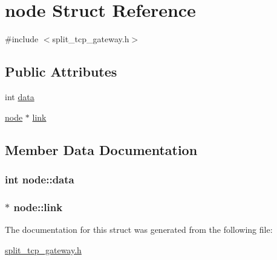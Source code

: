 \hypertarget{structnode}{\section{node \-Struct \-Reference}
\label{structnode}
}


{\ttfamily \#include $<$split\-\_\-tcp\-\_\-gateway.\-h$>$}

\subsection*{\-Public \-Attributes}
\begin{DoxyCompactItemize}
\item 
int \hyperlink{structnode_a2d890bb9f6af0ffd73fe79b21124c2a2}{data}
\item 
\hyperlink{structnode}{node} $\ast$ \hyperlink{structnode_af23d89eee1b0584d8eaf9a2e8d8f25ee}{link}
\end{DoxyCompactItemize}


\subsection{\-Member \-Data \-Documentation}
\hypertarget{structnode_a2d890bb9f6af0ffd73fe79b21124c2a2}{
\subsubsection[{data}]{\setlength{\rightskip}{0pt plus 5cm}int {\bf node\-::data}}}\label{structnode_a2d890bb9f6af0ffd73fe79b21124c2a2}
\hypertarget{structnode_af23d89eee1b0584d8eaf9a2e8d8f25ee}{
\subsubsection[{link}]{$\ast$ {\bf node\-::link}}}\label{structnode_af23d89eee1b0584d8eaf9a2e8d8f25ee}


\-The documentation for this struct was generated from the following file\-:\begin{DoxyCompactItemize}
\item 
\hyperlink{split__tcp__gateway_8h}{split\-\_\-tcp\-\_\-gateway.\-h}\end{DoxyCompactItemize}

